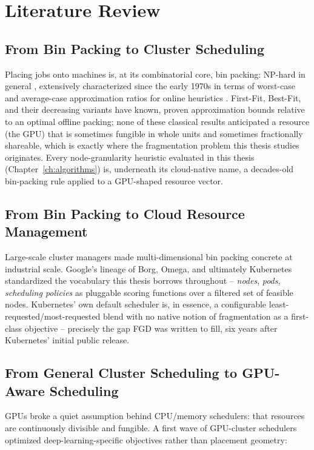 \documentclass[12pt]{report}
\begin{document}
\chapter{Literature Review}
\label{ch:litreview}

\section{From Bin Packing to Cluster Scheduling}
Placing jobs onto machines is, at its combinatorial core, bin packing:
NP-hard in general \citep{garey1979}, extensively characterized since the
early 1970s in terms of worst-case and average-case approximation ratios
for online heuristics \citep{johnson1974,coffman1984}. First-Fit,
Best-Fit, and their decreasing variants have known, proven approximation
bounds relative to an optimal offline packing; none of these classical
results anticipated a resource (the GPU) that is sometimes fungible
in whole units and sometimes fractionally shareable, which is exactly
where the fragmentation problem this thesis studies originates. Every
node-granularity heuristic evaluated in this thesis (Chapter~\ref{ch:algorithms})
is, underneath its cloud-native name, a decades-old bin-packing rule
applied to a GPU-shaped resource vector.

\section{From Bin Packing to Cloud Resource Management}
Large-scale cluster managers made multi-dimensional bin packing concrete
at industrial scale. Google's lineage of Borg, Omega, and ultimately
Kubernetes \citep{borg2016} standardized the vocabulary this thesis
borrows throughout -- \emph{nodes}, \emph{pods}, \emph{scheduling
policies} as pluggable scoring functions over a filtered set of feasible
nodes. Kubernetes' own default scheduler is, in essence, a configurable
least-requested/most-requested blend with no native notion of
fragmentation as a first-class objective -- precisely the gap FGD was
written to fill, six years after Kubernetes' initial public release.

\section{From General Cluster Scheduling to GPU-Aware Scheduling}
GPUs broke a quiet assumption behind CPU/memory schedulers: that
resources are continuously divisible and fungible. A first wave of
GPU-cluster schedulers optimized deep-learning-specific objectives rather
than placement geometry:
\end{document}
